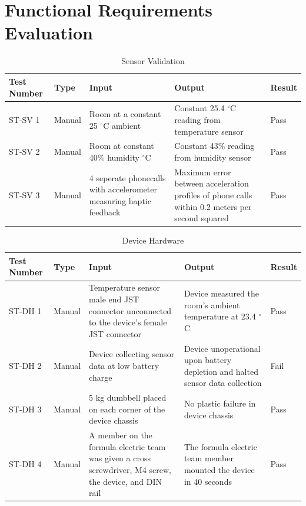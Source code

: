 \documentclass[12pt, titlepage]{article}
\begin{document}
\section{Functional Requirements Evaluation}
\begin{table}[!htbp]
  \begin{tabular}{| p{} | p{}| p{}| p{}| p{}|}
    \hline
    \rowcolor[gray]{0.9}
    Test Number & Type & Input & Output & Result\\
    \hline
    ST-SV 1 & Manual & Room at a constant 25 $^{\circ}$C ambient & Constant 25.4 $^{\circ}$C reading from temperature sensor & Pass \\
    \hline
    ST-SV 2 & Manual & Room at constant 40\% humidity $^{\circ}$C & Constant 43\% reading from humidity sensor & Pass \\
    \hline
    ST-SV 3 & Manual & 4 seperate phonecalls with accelerometer measuring haptic feedback & Maximum error between acceleration profiles of phone calls within 0.2 meters per second squared & Pass  \\
    \hline
  \end{tabular}
  \caption{Sensor Validation}
  \end{table}

\begin{table}[!htbp]
  \begin{tabular}{| p{} | p{}| p{}| p{}| p{}|}
    \hline
    \rowcolor[gray]{0.9}
    Test Number & Type & Input & Output & Result\\
    \hline
    ST-DH 1 & Manual & Temperature sensor male end JST connector unconnected to the device's female JST connector & Device measured the room's ambient temperature at 23.4 $^{\circ}$C & Pass \\
    \hline
    ST-DH 2 & Manual & Device collecting sensor data at low battery charge & Device unoperational upon battery depletion and halted sensor data collection & Fail \\
    \hline
    ST-DH 3 & Manual & 5 kg dumbbell placed on each corner of the device chassis & No plastic failure in device chassis & Pass  \\
    \hline
    ST-DH 4 & Manual & A member on the formula electric team was given a cross screwdriver, M4 screw, the device, and DIN rail & The formula electric team member mounted the device in 40 seconds & Pass  \\
    \hline
  \end{tabular}
  \caption{Device Hardware}
  \end{table} 
  \newpage 
\end{document}
